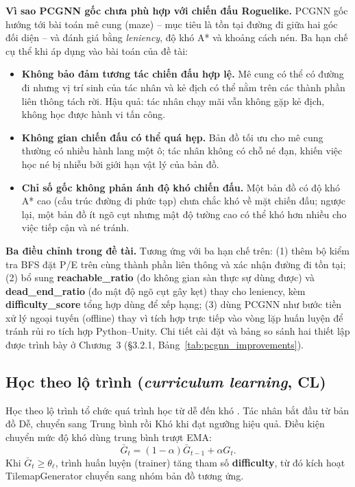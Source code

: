 \textbf{Vì sao PCGNN gốc chưa phù hợp với chiến đấu Roguelike.} PCGNN gốc hướng tới bài toán mê cung (maze) -- mục tiêu là tồn tại đường đi giữa hai góc đối diện -- và đánh giá bằng \emph{leniency}, độ khó A* và khoảng cách nén. Ba hạn chế cụ thể khi áp dụng vào bài toán của đề tài:
\begin{itemize}
    \item \textbf{Không bảo đảm tương tác chiến đấu hợp lệ.} Mê cung có thể có đường đi nhưng vị trí sinh của tác nhân và kẻ địch có thể nằm trên các thành phần liên thông tách rời. Hậu quả: tác nhân chạy mãi vẫn không gặp kẻ địch, không học được hành vi tấn công.
    \item \textbf{Không gian chiến đấu có thể quá hẹp.} Bản đồ tối ưu cho mê cung thường có nhiều hành lang một ô; tác nhân không có chỗ né đạn, khiến việc học né bị nhiễu bởi giới hạn vật lý của bản đồ.
    \item \textbf{Chỉ số gốc không phản ánh độ khó chiến đấu.} Một bản đồ có độ khó A* cao (cấu trúc đường đi phức tạp) chưa chắc khó về mặt chiến đấu; ngược lại, một bản đồ ít ngõ cụt nhưng mật độ tường cao có thể khó hơn nhiều cho việc tiếp cận và né tránh.
\end{itemize}

\textbf{Ba điều chỉnh trong đề tài.} Tương ứng với ba hạn chế trên: (1) thêm bộ kiểm tra BFS đặt P/E trên cùng thành phần liên thông và xác nhận đường đi tồn tại; (2) bổ sung \textbf{reachable\_ratio} (đo không gian sàn thực sự dùng được) và \textbf{dead\_end\_ratio} (đo mật độ ngõ cụt gây kẹt) thay cho leniency, kèm \textbf{difficulty\_score} tổng hợp dùng để xếp hạng; (3) dùng PCGNN như bước tiền xử lý ngoại tuyến (offline) thay vì tích hợp trực tiếp vào vòng lặp huấn luyện để tránh rủi ro tích hợp Python--Unity. Chi tiết cài đặt và bảng so sánh hai thiết lập được trình bày ở Chương~3 (§3.2.1, Bảng~\ref{tab:pcgnn_improvements}).

\subsection{Học theo lộ trình (\emph{curriculum learning}, CL)}

Học theo lộ trình tổ chức quá trình học từ dễ đến khó \cite{Bengio2009}. Tác nhân bắt đầu từ bản đồ Dễ, chuyển sang Trung bình rồi Khó khi đạt ngưỡng hiệu quả. Điều kiện chuyển mức độ khó dùng trung bình trượt EMA:
\begin{equation}
    \bar{G}_t = (1-\alpha)\bar{G}_{t-1} + \alpha G_t.
    \label{eq:curriculum_ema}
\end{equation}
Khi $\bar{G}_t \geq \theta_\ell$, trình huấn luyện (trainer) tăng tham số \textbf{difficulty}, từ đó kích hoạt TilemapGenerator chuyển sang nhóm bản đồ tương ứng.

